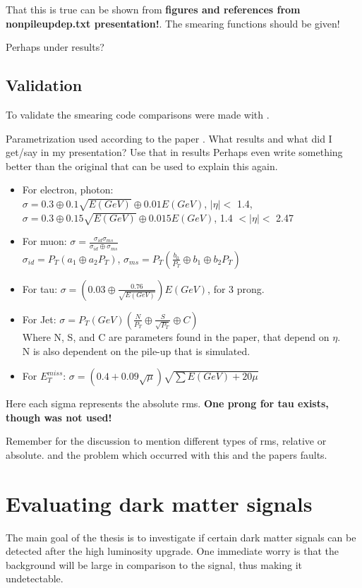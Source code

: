 That this is true can be shown from \textbf{figures and references from nonpileupdep.txt presentation!}. The smearing functions should be given!

Perhaps under results?
\subsection{Validation}
To validate the smearing code comparisons were made with \citep{ATL-PHYS-PUB-2013-004}. 

Parametrization used according to the paper \citep{ATL-PHYS-PUB-2013-004}. What results and what did I get/say in my presentation? Use that in results Perhaps even write something better than the original that can be used to explain this again.

\begin{itemize}
\item For electron, photon:\\
$\sigma=0.3\oplus 0.1\sqrt{E(GeV)}\oplus 0.01E(GeV)$, $|\eta|<$ 1.4, \\
$\sigma=0.3\oplus 0.15\sqrt{E(GeV)}\oplus 0.015E(GeV)$, 1.4 $<|\eta|<$ 2.47 
\item For muon: $\sigma=\frac{\sigma_{id} \sigma_{ms}}{\sigma_{id} \oplus \sigma_{ms}}$\\
$\sigma_{id}=P_T(a_1 \oplus a_2 P_T)$, $\sigma_{ms}=P_T(\frac{b_0}{P_T} \oplus b_1 \oplus b_2 P_T)$
\item For tau: $\sigma =(0.03\oplus \frac{0.76}{\sqrt{E(GeV)}})E(GeV)$, for 3 prong. 
\item For Jet: $\sigma = P_T(GeV)(\frac{N}{P_T} \oplus \frac{S}{\sqrt{P_T}} \oplus C)$ \\
Where N, S, and C are parameters found in the paper, that depend on $\eta$. 
\\N is also dependent on the pile-up that is simulated.
\item For $E_T^{miss}$: $\sigma = (0.4+0.09\sqrt{\mu})\sqrt{\sum E(GeV)+20\mu}$
\end{itemize}
Here each sigma represents the absolute rms. 
\textbf{One prong for tau exists, though was not used!}

Remember for the discussion to mention different types of rms, relative or absolute. and the problem which occurred with this and the papers faults.

\section{Evaluating dark matter signals}
The main goal of the thesis is to investigate if certain dark matter signals can be detected after the high luminosity upgrade. One immediate worry is that the background will be large in comparison to the signal, thus making it undetectable. 

